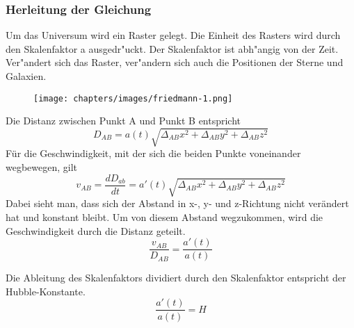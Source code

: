 \begin{refsection}
\subsubsection{Herleitung der Gleichung}
Um das Universum wird ein Raster gelegt. Die Einheit des Rasters wird durch den Skalenfaktor a ausgedr"uckt. Der Skalenfaktor ist abh"angig von der Zeit. Ver"andert sich das Raster, ver"andern sich auch die Positionen der Sterne und Galaxien.
\begin{figure}
	\texttt{[image: chapters/images/friedmann-1.png]}
\end{figure}
Die Distanz zwischen Punkt A und Punkt B entspricht 
\begin{equation}
D_{AB} = a(t) \sqrt{\Delta_{AB}x^2 + \Delta_{AB}y^2 + \Delta_{AB}z^2}
\end{equation}
F\"{u}r die Geschwindigkeit, mit der sich die beiden Punkte voneinander wegbewegen, gilt
\begin{equation}
v_{AB} = \dfrac{dD_{ab}}{dt} 
	   = a'(t) \sqrt{\Delta_{AB}x^2 + \Delta_{AB}y^2 + \Delta_{AB}z^2}
\end{equation}
Dabei sieht man, dass sich der Abstand in x-, y- und z-Richtung nicht ver\"{a}ndert hat und konstant bleibt. Um von diesem Abstand wegzukommen, wird die Geschwindigkeit durch die Distanz geteilt.
\begin{equation}
\frac{v_{AB} }{D_{AB}} = \frac{a'(t)}{a(t)}
\end{equation}
\begin{satz} 
	Die Ableitung des Skalenfaktors dividiert durch den Skalenfaktor entspricht der Hubble-Konstante.
	\begin{equation}
	\frac{a'(t)}{a(t)} = H
	\end{equation}
\end{satz}
\end{refsection}

